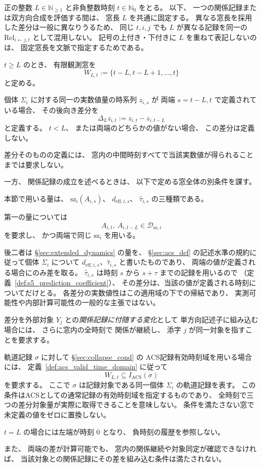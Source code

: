 \begin{definition}
\label{def:finite_window_diff}
正の整数 $L\in\mathbb N_{\geq1}$ と非負整数時刻 $t\in\mathbb N_0$ をとる。
以下、
一つの関係記録または双方向合成を評価する間は、
窓長 $L$ を共通に固定する。
異なる窓長を採用した差分は一般に異なりうるため、
同じ $t,i,j$ でも
$L$ が異なる記録を同一の $\mathrm{Rel}_{i\leftarrow j,t}$ として混用しない。
記号の上付き・下付きに $L$ を重ねて表記しないのは、
固定窓長を文脈で指定するためである。

$t\geq L$ のとき、
有限観測窓を
\[
 W_{L,t}:=\{t-L,t-L+1,\ldots,t\}
\]
と定める。

個体 $\Sigma_i$ に対する同一の実数値量の時系列 $z_{i,s}$ が
両端 $s=t-L,t$ で定義されている場合、
その後向き差分を
\[
 \Delta_L z_{i,t}:=z_{i,t}-z_{i,t-L}
\]
と定義する。
$t<L$、
または両端のどちらかの値がない場合、
この差分は定義しない。

差分そのものの定義には、
窓内の中間時刻すべてで当該実数値が得られることまでは要求しない。

一方、
関係記録の成立を述べるときは、
以下で定める窓全体の別条件を課す。

本節で用いる量は、
$\mathrm{sz}_i(A_{i,s})$、
$ d_{\mathrm{eff},i,s}$、
$\widehat\tau_{i,s}$ の三種類である。

第一の量については
\[
 A_{i,t},\ A_{i,t-L}\in\mathcal D_{\mathrm{sz},i}
\]
を要求し、
かつ両端で同じ $\mathrm{sz}_i$ を用いる。

後二者は \S\ref{sec:extended_dynamics} の量を、
\S\ref{sec:acs_def} の記述水準の規約に従って個体 $\Sigma_i$ について
$d_{\mathrm{eff},i,s}$、$\widehat\tau_{i,s}$ と書いたものであり、
両端の値が定義される場合にのみ差を取る。
$\widehat\tau_{i,s}$ は時刻 $s$ から $s+\tau$ までの記録を用いるので
（定義~\ref{def:s5_prediction_coefficient}）、
その差分は、当該の値が定義される時刻についてだけとる。
各差分の実数値性はこの適用域の下での帰結であり、
実測可能性や内部計算可能性の一般的な主張ではない。

差分を外部対象 $Y_j$ との\emph{関係記録に付随する変化}として
単方向記述子に組み込む場合には、
さらに窓内の全時刻で
関係が継続し、
添字 $j$ が同一対象を指すことを要求する。

軌道記録 $\sigma$ に対して \S\ref{sec:collapse_cond} の
ACS記録有効時刻域を用いる場合には、
定義~\ref{def:acs_valid_time_domain} に従って
\[
 W_{L,t}\subseteq I_{\mathrm{ACS}}(\sigma)
\]
を要求する。
ここで $\sigma$ は記録対象である同一個体 $\Sigma_i$ の軌道記録を表す。
この条件はACSとしての通常記録の有効時刻域を指定するものであり、
全時刻で三つの差分対象量が実際に取得できることを意味しない。
条件を満たさない窓で未定義の値をゼロに置換しない。

$t=L$ の場合には左端が時刻 $0$ となり、
負時刻の履歴を参照しない。

また、
両端の差が計算可能でも、
窓内の関係継続や対象同定が確認できなければ、
当該対象との関係記録にその差を組み込む条件は満たされない。
\end{definition}

